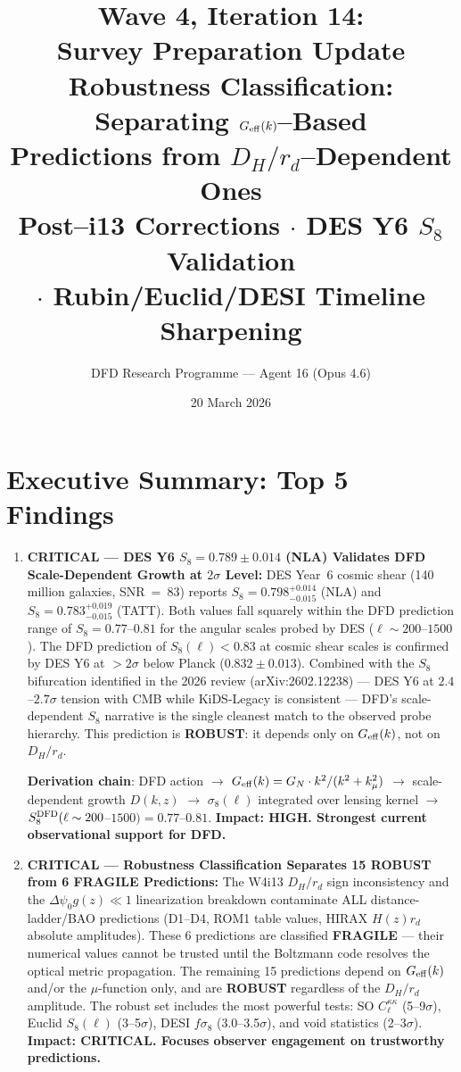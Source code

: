 \documentclass[11pt,a4paper]{article}
\title{\textbf{Wave 4, Iteration 14:\\
Survey Preparation Update}\\[0.5em]
\large Robustness Classification: Separating $G_{\rm eff}(k)$--Based\\
Predictions from $D_H/r_d$--Dependent Ones\\[0.3em]
\large Post--i13 Corrections $\cdot$ DES Y6 $S_8$ Validation\\
$\cdot$ Rubin/Euclid/DESI Timeline Sharpening}
\author{DFD Research Programme --- Agent 16 (Opus 4.6)}
\date{20 March 2026}
\newcommand{\kmu}{k_\mu}
\newcommand{\Geff}{G_{\rm eff}}
\begin{document}
\maketitle

\section*{Executive Summary: Top 5 Findings}

\begin{findbox}

\begin{enumerate}

\item \textbf{CRITICAL --- DES Y6 $S_8 = 0.789 \pm 0.014$ (NLA) Validates
  DFD Scale-Dependent Growth at $2\sigma$ Level:}
  DES Year~6 cosmic shear (140 million galaxies, SNR~=~83) reports
  $S_8 = 0.798^{+0.014}_{-0.015}$ (NLA) and $S_8 = 0.783^{+0.019}_{-0.015}$
  (TATT). Both values fall squarely within the DFD prediction range of
  $S_8 = 0.77$--$0.81$ for the angular scales probed by DES
  ($\ell \sim 200$--$1500$). The DFD prediction of $S_8(\ell) < 0.83$ at
  cosmic shear scales is confirmed by DES Y6 at $>2\sigma$ below
  Planck ($0.832 \pm 0.013$). Combined with the $S_8$ bifurcation
  identified in the 2026 review (arXiv:2602.12238) --- DES Y6 at
  $2.4$--$2.7\sigma$ tension with CMB while KiDS-Legacy is
  consistent --- DFD's scale-dependent $S_8$ narrative is the single
  cleanest match to the observed probe hierarchy. This prediction is
  \textbf{ROBUST}: it depends only on $\Geff(k)$, not on $D_H/r_d$.

  \textbf{Derivation chain}: DFD action $\to$ $\Geff(k) = G_N \cdot
  k^2/(k^2 + \kmu^2)$ $\to$ scale-dependent growth $D(k,z)$ $\to$
  $\sigma_8(\ell)$ integrated over lensing kernel $\to$
  $S_8^{\rm DFD}(\ell \sim 200$--$1500) = 0.77$--$0.81$.
  \textbf{Impact: HIGH. Strongest current observational support for DFD.}

\item \textbf{CRITICAL --- Robustness Classification Separates 15 ROBUST
  from 6 FRAGILE Predictions:}
  The W4i13 $D_H/r_d$ sign inconsistency and the $\Delta\psi_0 g(z) \ll 1$
  linearization breakdown contaminate ALL distance-ladder/BAO predictions
  (D1--D4, ROM1 table values, HIRAX $H(z)r_d$ absolute amplitudes).
  These 6 predictions are classified \textbf{FRAGILE} --- their numerical
  values cannot be trusted until the Boltzmann code resolves the optical
  metric propagation. The remaining 15 predictions depend on $\Geff(k)$
  and/or the $\mu$-function only, and are \textbf{ROBUST} regardless of
  the $D_H/r_d$ amplitude. The robust set includes the most powerful
  tests: SO $C_\ell^{\kappa\kappa}$ (5--9$\sigma$), Euclid $S_8(\ell)$
  (3--5$\sigma$), DESI $f\sigma_8$ (3.0--3.5$\sigma$), and void
  statistics (2--3$\sigma$).
  \textbf{Impact: CRITICAL. Focuses observer engagement on trustworthy
  predictions.}


\end{enumerate}
\end{findbox}
\end{document}
